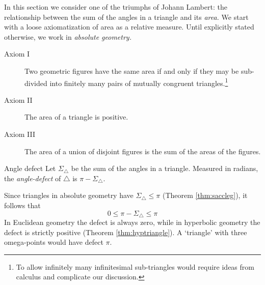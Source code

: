 In this section we consider one of the triumphs of Johann Lambert: the relationship between the sum of the angles in a triangle and its \emph{area.} We start with a loose axiomatization of area as a relative measure. Until explicitly stated otherwise, we work in \emph{absolute geometry.}

\begin{description}
	\item[Axiom I] Two geometric figures have the same area if and only if they may be sub-divided into finitely many pairs of mutually congruent triangles.\footnote{To allow infinitely many infinitesimal sub-triangles would require ideas from calculus and complicate our discussion.}
	\item[Axiom II] The area of a triangle is positive.
	\item[Axiom III] The area of a union of disjoint figures is the sum of the areas of the figures.
\end{description}

\begin{defn}{Angle defect}{}
	Let $\Sigma_\triangle$ be the sum of the angles in a triangle. Measured in radians, the \emph{angle-defect} of $\triangle$ is $\pi-\Sigma_\triangle$.
\end{defn}

Since triangles in absolute geometry have $\Sigma_\triangle\le\pi$ (Theorem \ref{thm:saccleg}), it follows that
\[
	0\le\pi-\Sigma_\triangle\le\pi
\]
In Euclidean geometry the defect is always zero, while in hyperbolic geometry the defect is strictly positive (Theorem \ref{thm:hyptriangle}). A `triangle' with three omega-points would have defect $\pi$.

